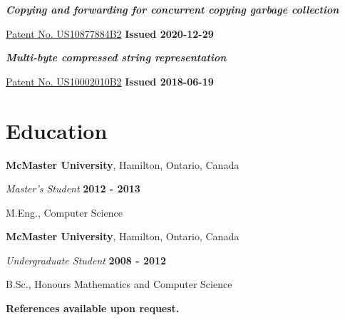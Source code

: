 \documentclass[margin,line]{res}
\begin{document}
\begin{resume}
\begin{list}{}{\leftmargin=0cm}
\item {\em \bf Copying and forwarding for concurrent copying garbage collection}

\href{https://patents.google.com/patent/US10877884B2}{Patent No. US10877884B2} \hfill {\bf Issued 2020-12-29}

\item {\em \bf Multi-byte compressed string representation}

\href{https://patents.google.com/patent/US10002010B2}{Patent No. US10002010B2} \hfill {\bf Issued 2018-06-19}

\end{list}

\section{\sc Education}

{\bf McMaster University}, Hamilton, Ontario, Canada

\vspace{-.3cm}

{\em Master's Student} \hfill {\bf 2012 - 2013}

\vspace{-.4cm}

M.Eng., Computer Science

{\bf McMaster University}, Hamilton, Ontario, Canada

\vspace{-.3cm}

{\em Undergraduate Student} \hfill {\bf 2008 - 2012}

\vspace{-.4cm}

B.Sc., Honours Mathematics and Computer Science

\begin{center}
\textbf{References available upon request.}
\end{center}

\end{resume}
\end{document}
